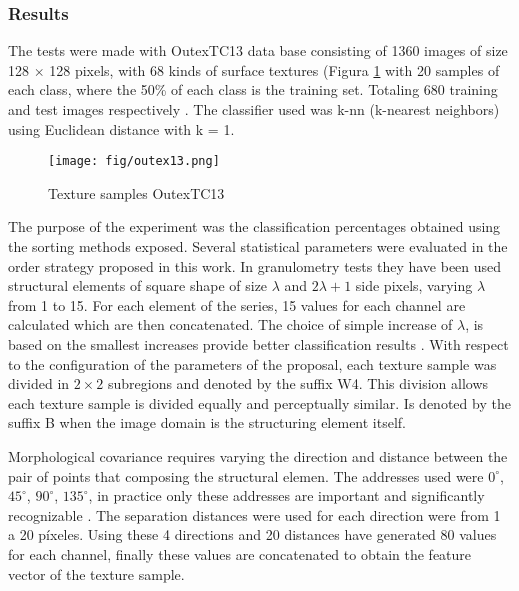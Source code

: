 \subsubsection{Results}
\label{sec:resultadosexperi}
The tests were made with OutexTC13 data base consisting of 1360 images of size  128 $\times $ 128 pixels, with 68 kinds of surface textures (Figura \ref{fig:outex13} with 20 samples of each class, where the 50\% of each class is the training set. Totaling 680 training and test images respectively \cite{ojala2002outex}.  
The classifier used was k-nn (k-nearest neighbors) using Euclidean distance with k = 1. 

\begin{figure}
	\centering
		\texttt{[image: fig/outex13.png]}
	\caption{Texture samples OutexTC13}
	\label{fig:outex13}
\end{figure}

The purpose of the experiment was the classification percentages obtained using the sorting methods exposed.
Several statistical parameters were evaluated in the order strategy proposed in this work.
In granulometry tests they have been used structural elements of square shape of size  $\lambda$ and $2\lambda+1$ side pixels, varying $\lambda$ from 1 to 15. For each element of the series, 15 values for each channel are calculated which are then concatenated. The choice of simple increase of $\lambda$, is based on the smallest increases provide better classification results \cite{de2006selecting}. 
With respect to the configuration of the parameters of the proposal, each texture sample was divided in $2\times2$  subregions and  denoted by the suffix W4. This division allows each texture sample is divided equally and perceptually similar. Is denoted by the suffix B when the image domain is the structuring element itself. 

Morphological covariance requires varying the direction and distance between the pair of points that composing the structural elemen. The addresses used were $0^{\circ}$, $45^{\circ}$, $90^{\circ}$,  $135^{\circ}$, in practice only these addresses are important and significantly recognizable \cite{hanbury2005illumination}. The separation distances were used for each direction were from 1 a 20 píxeles. Using these 4 directions and 20 distances have generated 80 values for each channel, finally these values are concatenated to obtain the feature vector of the texture sample. 
 
